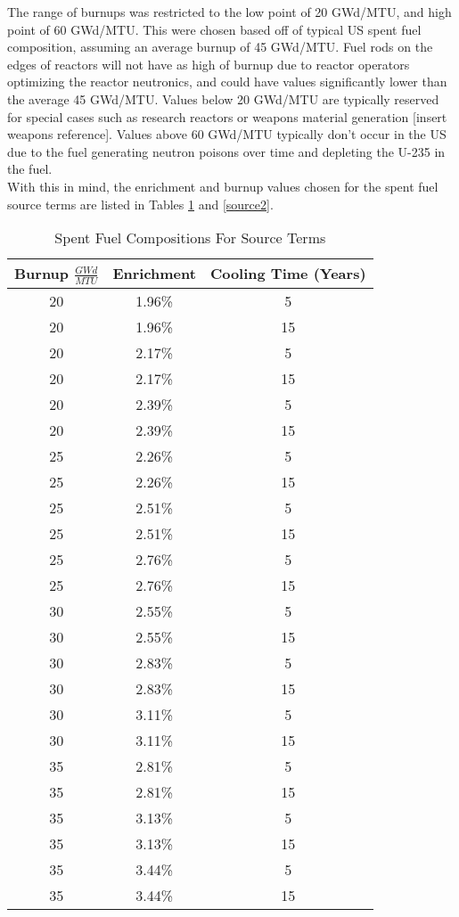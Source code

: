 The range of burnups was restricted to the low point of 20 GWd/MTU, and high point of 60 GWd/MTU. This were chosen based off of typical US spent fuel composition, assuming an average burnup of 45 GWd/MTU. Fuel rods on the edges of reactors will not have as high of burnup due to reactor operators optimizing the reactor neutronics, and could have values significantly lower than the average 45 GWd/MTU. Values below 20 GWd/MTU are typically reserved for special cases such as research reactors or weapons material generation [insert weapons reference]. Values above 60 GWd/MTU typically don't occur in the US due to the fuel generating neutron poisons over time and depleting the U-235 in the fuel. \\

With this in mind, the enrichment and burnup values chosen for the spent fuel source terms are listed in Tables \ref{source1} and \ref{source2}. \\



\begin{table}[p!]
\caption{Spent Fuel Compositions For Source Terms}
\label{source1}
\begin{center}
\begin{tabular}[b]{|c|c|c|}
	\hline
	Burnup $\frac{GWd}{MTU}$ & Enrichment & Cooling Time (Years)\\ \hline
	20 & 1.96\% & 5 \\ \hline
	20 & 1.96\% & 15 \\ \hline
	20 & 2.17\% & 5 \\ \hline
	20 & 2.17\% & 15 \\ \hline
	20 & 2.39\% & 5 \\ \hline
	20 & 2.39\% & 15 \\ \hline
	25 & 2.26\% & 5 \\ \hline
	25 & 2.26\% & 15 \\ \hline
	25 & 2.51\% & 5 \\ \hline
	25 & 2.51\% & 15 \\ \hline
	25 & 2.76\% & 5 \\ \hline
	25 & 2.76\% & 15 \\ \hline
	30 & 2.55\% & 5 \\ \hline
	30 & 2.55\% & 15 \\ \hline
	30 & 2.83\% & 5 \\ \hline
	30 & 2.83\% & 15 \\ \hline
	30 & 3.11\% & 5 \\ \hline
	30 & 3.11\% & 15 \\ \hline
	35 & 2.81\% & 5 \\ \hline
	35 & 2.81\% & 15 \\ \hline
	35 & 3.13\% & 5 \\ \hline
	35 & 3.13\% & 15 \\ \hline
	35 & 3.44\% & 5 \\ \hline
	35 & 3.44\% & 15 \\ \hline


\end{tabular}
\end{center}
\end{table}



